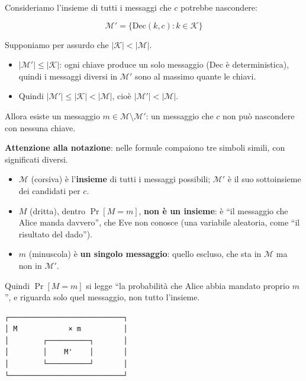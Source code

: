 Consideriamo l'insieme di tutti i messaggi che \(c\) potrebbe nascondere:

\[
\mathcal{M}' = \{\text{Dec}(k, c) : k \in \mathcal{K}\}
\]

Supponiamo per assurdo che \(|\mathcal{K}| < |\mathcal{M}|\).

\begin{itemize}
\tightlist
\item
  \(|\mathcal{M}'| \le |\mathcal{K}|\): ogni chiave produce un solo messaggio (Dec è deterministica), quindi i messaggi diversi in \(\mathcal{M}'\) sono al massimo quante le chiavi.
\item
  Quindi \(|\mathcal{M}'| \le |\mathcal{K}| < |\mathcal{M}|\), cioè \(|\mathcal{M}'| < |\mathcal{M}|\).
\end{itemize}

Allora esiste un messaggio \(m \in \mathcal{M} \setminus \mathcal{M}'\): un messaggio che \(c\) non può nascondere con nessuna chiave.

\begin{nota}

\textbf{Attenzione alla notazione}: nelle formule compaiono tre simboli simili, con significati diversi.

\begin{itemize}
\tightlist
\item
  \(\mathcal{M}\) (corsiva) è l'\textbf{insieme} di tutti i messaggi possibili; \(\mathcal{M}'\) è il suo sottoinsieme dei candidati per \(c\).
\item
  \(M\) (dritta), dentro \(\Pr[M = m]\), \textbf{non è un insieme}: è ``il messaggio che Alice manda davvero'', che Eve non conosce (una variabile aleatoria, come ``il risultato del dado'').
\item
  \(m\) (minuscola) è \textbf{un singolo messaggio}: quello escluso, che sta in \(\mathcal{M}\) ma non in \(\mathcal{M}'\).
\end{itemize}

Quindi \(\Pr[M = m]\) si legge ``la probabilità che Alice abbia mandato proprio \(m\)'', e riguarda solo quel messaggio, non tutto l'insieme.

\end{nota}

\begin{verbatim}
┌───────────────────────────┐
│ M            × m          │
│        ┌──────────┐       │
│        │    M'    │       │
│        └──────────┘       │
└───────────────────────────┘
\end{verbatim}

